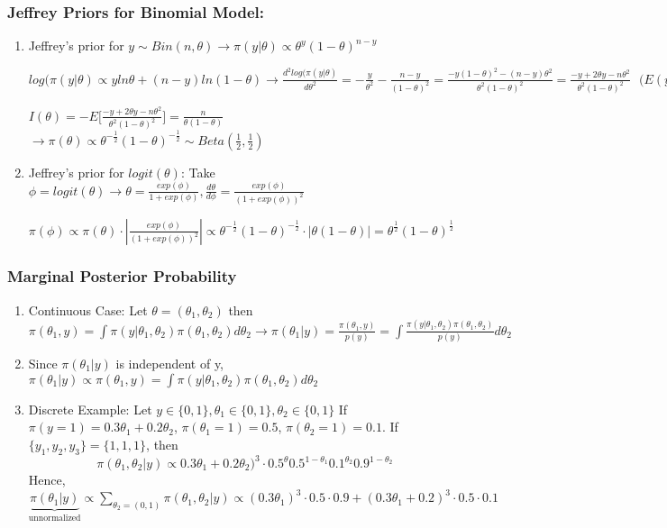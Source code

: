 \documentclass{beamer}
\begin{document}
\begin{frame}
\frametitle{Jeffrey Priors for Binomial Model:}
\begin{enumerate}
\item  Jeffrey's prior for $y \sim Bin(n,\theta) \rightarrow \pi(y|\theta) \propto \theta^y(1-\theta)^{n-y}$

$log(\pi(y|\theta) \propto yln\theta + (n-y)ln(1-\theta) \rightarrow \frac{d^2log(\pi(y|\theta)}{d\theta^2} = -\frac{y}{\theta^2} - \frac{n-y}{(1-\theta)^2} = \frac{-y(1-\theta)^2-(n-y)\theta^2}{\theta^2 (1-\theta)^2} = \frac{-y+2\theta y - n\theta^2}{\theta^2 (1-\theta)^2} \ \ \ \Big(E(y) = n\theta\Big)$

$I(\theta) = -E\Big[ \frac{-y+2\theta y - n\theta^2}{\theta^2 (1-\theta)^2}\Big] = \frac{n}{\theta(1-\theta)}$
$\rightarrow \pi(\theta) \propto \theta^{-\frac{1}{2}} (1-\theta)^{-\frac{1}{2}} \sim Beta(\frac{1}{2},\frac{1}{2})$

\item  Jeffrey's prior for $logit(\theta)$: Take $\phi = logit(\theta) \rightarrow \theta = \frac{exp(\phi)}{1+exp(\phi)}, \frac{d\theta}{d\phi} = \frac{exp(\phi)}{(1+exp(\phi))^2}$

$\pi(\phi) \propto \pi(\theta) \cdot |\frac{exp(\phi)}{(1+exp(\phi))^2}| \propto \theta^{-\frac{1}{2}} (1-\theta)^{-\frac{1}{2}} \cdot |\theta (1-\theta)|  = \theta^{\frac{1}{2}} (1-\theta)^{\frac{1}{2}}$

\end{enumerate}

\end{frame}

\begin{frame}
\frametitle{Marginal Posterior Probability}

\begin{enumerate}
\item Continuous Case: Let $\theta = (\theta_1, \theta_2)$ then $\pi(\theta_1,y) = \int \pi(y|\theta_1,\theta_2) \pi(\theta_1,\theta_2) d\theta_2 \rightarrow \pi(\theta_1|y) = \frac{\pi(\theta_1,y)}{p(y)} = \int \frac{\pi(y|\theta_1,\theta_2) \pi(\theta_1,\theta_2)}{p(y)} d\theta_2$

\item Since $\pi(\theta_1|y)$ is independent of y, $\pi(\theta_1|y) \propto \pi(\theta_1,y) = \int \pi(y|\theta_1,\theta_2) \pi(\theta_1,\theta_2) d\theta_2$

\item Discrete Example: Let $y \in \{0,1 \}, \theta_1 \in \{0,1 \}, \theta_2 \in \{0,1 \}$ If $\pi(y=1) = 0.3 \theta_1 + 0.2 \theta_2$, $\pi(\theta_1 =1) = 0.5$, $\pi(\theta_2 = 1) = 0.1$. If $\{y_1,y_2,y_3 \} = \{1,1,1 \}$, then $$\pi(\theta_1,\theta_2|y) \propto 0.3\theta_1 + 0.2\theta_2)^3 \cdot 0.5^{\theta}0.5^{1-\theta_1}0.1^{\theta_2}0.9^{1-\theta_2}$$
Hence, $\underbrace{\pi(\theta_1|y)}_{\text{unnormalized}} \propto \sum_{\theta_2=(0,1)} \pi(\theta_1,\theta_2|y) \propto (0.3\theta_1)^3\cdot 0.5 \cdot 0.9 + (0.3\theta_1+ 0.2)^3 \cdot 0.5 \cdot 0.1$

\end{enumerate}

\end{frame}
\end{document}
